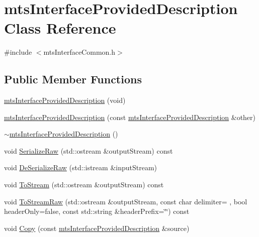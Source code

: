 \hypertarget{classmts_interface_provided_description}{}\section{mts\+Interface\+Provided\+Description Class Reference}
\label{classmts_interface_provided_description}


{\ttfamily \#include $<$mts\+Interface\+Common.\+h$>$}

\subsection*{Public Member Functions}
\begin{DoxyCompactItemize}
\item 
\hyperlink{classmts_interface_provided_description_aa7d7892ab9cfd0a937c793aa4017f323}{mts\+Interface\+Provided\+Description} (void)
\item 
\hyperlink{classmts_interface_provided_description_a6b80527837f110b297cad1eb04ae2b5e}{mts\+Interface\+Provided\+Description} (const \hyperlink{classmts_interface_provided_description}{mts\+Interface\+Provided\+Description} \&other)
\item 
\hyperlink{classmts_interface_provided_description_a9f42a0d44f11a1c907b212eac95dce03}{$\sim$mts\+Interface\+Provided\+Description} ()
\item 
void \hyperlink{classmts_interface_provided_description_a4f2fc41b4a594f2e29126af5953e9adc}{Serialize\+Raw} (std\+::ostream \&output\+Stream) const 
\item 
void \hyperlink{classmts_interface_provided_description_a22c537e81fee36814c31c70963960076}{De\+Serialize\+Raw} (std\+::istream \&input\+Stream)
\item 
void \hyperlink{classmts_interface_provided_description_ae9add2d515deb3ee86ee578000184ac2}{To\+Stream} (std\+::ostream \&output\+Stream) const 
\item 
void \hyperlink{classmts_interface_provided_description_a21b511f570e6c241ee9078d9a89b57c2}{To\+Stream\+Raw} (std\+::ostream \&output\+Stream, const char delimiter= \textquotesingle{} \textquotesingle{}, bool header\+Only=false, const std\+::string \&header\+Prefix=\char`\"{}\char`\"{}) const 
\item 
void \hyperlink{classmts_interface_provided_description_a2432361981dc3343eeef4720248e025b}{Copy} (const \hyperlink{classmts_interface_provided_description}{mts\+Interface\+Provided\+Description} \&source)

\end{DoxyCompactItemize}
